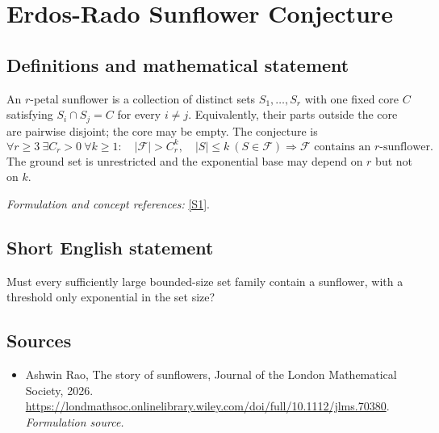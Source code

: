 \documentclass[11pt]{article}
\begin{document}
\section*{\texorpdfstring{Erdos-Rado Sunflower Conjecture}{Erdos-Rado Sunflower Conjecture}}\label{149}
\subsection{Definitions and mathematical statement}
An $r$-petal sunflower is a collection of distinct sets $S_1,\ldots,S_r$ with one fixed core $C$ satisfying $S_i\cap S_j=C$ for every $i\ne j$. Equivalently, their parts outside the core are pairwise disjoint; the core may be empty. The conjecture is
\[
 \forall r\ge3\ \exists C_r>0\ \forall k\ge1:\quad
 |\mathcal F|>C_r^k,\quad|S|\le k\ (S\in\mathcal F)
 \Rightarrow\mathcal F\text{ contains an }r\text{-sunflower}.
\]
The ground set is unrestricted and the exponential base may depend on $r$ but not on $k$.
\par\smallskip\textit{Formulation and concept references:} \href{https://londmathsoc.onlinelibrary.wiley.com/doi/full/10.1112/jlms.70380}{[S1]}.

\subsection{Short English statement}
Must every sufficiently large bounded-size set family contain a sunflower, with a threshold only exponential in the set size?
\subsection{Sources}
\begin{itemize}
\item[S1]Ashwin Rao, The story of sunflowers, Journal of the London Mathematical Society, 2026.
\url{https://londmathsoc.onlinelibrary.wiley.com/doi/full/10.1112/jlms.70380}.
\textit{Formulation source.}
\end{itemize}
\end{document}
